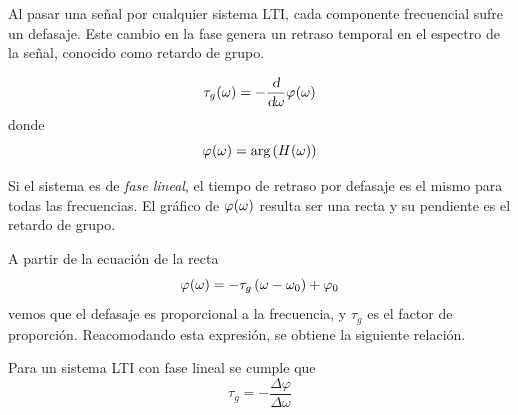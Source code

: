 Al pasar una señal por cualquier sistema LTI, cada componente frecuencial sufre un defasaje.
Este cambio en la fase genera un retraso temporal en el espectro de la señal, conocido como retardo de grupo.

\begin{mdframed}[style=DefinitionFrame]
    \begin{defn}
        \label{defn:groupDelay}
    \end{defn}
    \[
        \fx[\tau_g]{\omega} = - \frac{\dif}{\dif \omega} \fx[\varphi]{\omega}
    \]
    donde
    \[
        \fx[\varphi]{\omega} = \fx[\arg]{\fx[H]{\omega}}
    \]
\end{mdframed}

Si el sistema es de \emph{fase lineal}, el tiempo de retraso por defasaje es el mismo para todas las frecuencias.
El gráfico de $\fx[\varphi]{\omega}$ resulta ser una recta y su pendiente es el retardo de grupo.

A partir de la ecuación de la recta
\[
    \fx[\varphi]{\omega} = - \tau_g \inParentheses{\omega - \omega_0} + \varphi_0
\]
vemos que el defasaje es proporcional a la frecuencia, y $\tau_g$ es el factor de proporción.
Reacomodando esta expresión, se obtiene la siguiente relación.

\begin{mdframed}[style=PropertyFrame]
    \begin{prop}
    \end{prop}
    Para un sistema LTI con fase lineal se cumple que
    \[
        \tau_g = - \frac{\Delta \varphi}{\Delta \omega}
    \]
\end{mdframed}

